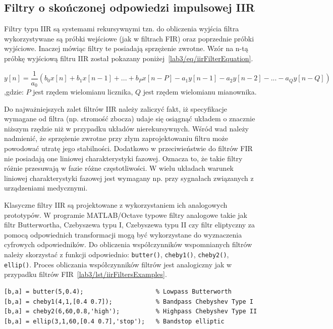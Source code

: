 \subsection{Filtry o skończonej odpowiedzi impulsowej IIR}
Filtry typu IIR są systemami rekursywnymi tzn. do obliczenia wyjścia filtra wykorzystywane są próbki wejściowe (jak w filtrach FIR) oraz poprzednie próbki wyjściowe. Inaczej mówiąc filtry te posiadają sprzężenie zwrotne. Wzór na n-tą próbkę wyjściową filtru IIR został pokazany poniżej~\ref{lab3/eq/iirFilterEquation}.

\begin{equation}\label{lab3/eq/iirFilterEquation}
	y[n] = \frac{1}{a_0} (b_0 x[n] + b_1 x[n-1] + ... + b_P x[n-P] - a_1 y[n-1] - a_2 y[n-2] - ... - a_Q y[n-Q])
\end{equation}
,gdzie: $P$ jest rzędem wielomianu licznika, $Q$ jest rzędem wielomianu mianownika.

Do najważniejszych zalet filtrów IIR należy zaliczyć fakt, iż specyfikacje wymagane od filtra (np. stromość zbocza) udaje się osiągnąć układem o znacznie niższym rzędzie niż w przypadku układów nierekursywnych. Wśród wad należy nadmienić, że sprzężenie zwrotne przy złym zaprojektowaniu filtru może powodować utratę jego stabilności. Dodatkowo w przeciwieństwie do filtrów FIR nie posiadają one liniowej charakterystyki fazowej. Oznacza to, że takie filtry różnie przesuwają w fazie różne częstotliwości. W wielu układach warunek liniowej charakterystyki fazowej jest wymagany np. przy sygnałach związanych z urządzeniami medycznymi.

Klasyczne filtry IIR są projektowane z wykorzystaniem ich analogowych prototypów. W programie MATLAB/Octave typowe filtry analogowe takie jak filtr Butterwortha, Czebyszewa typu I, Czebyszewa typu II czy filtr eliptyczny za pomocą odpowiednich transformacji mogą być wykorzystane do wyznaczenia cyfrowych odpowiedników. Do obliczenia współczynników wspomnianych filtrów należy skorzystać z funkcji odpowiednio: \texttt{butter()}, \texttt{cheby1()}, \texttt{cheby2()}, \texttt{ellip()}. Proces obliczania współczynników filtrów jest analogiczny jak w przypadku filtrów FIR~\ref{lab3/lst/iirFiltersExamples}. 

\begin{lstlisting}[caption=Przykłady filtrów rekursywnych, label=lab3/lst/iirFiltersExamples]
[b,a] = butter(5,0.4);                    % Lowpass Butterworth
[b,a] = cheby1(4,1,[0.4 0.7]);            % Bandpass Chebyshev Type I
[b,a] = cheby2(6,60,0.8,'high');          % Highpass Chebyshev Type II
[b,a] = ellip(3,1,60,[0.4 0.7],'stop');   % Bandstop elliptic
\end{lstlisting}

